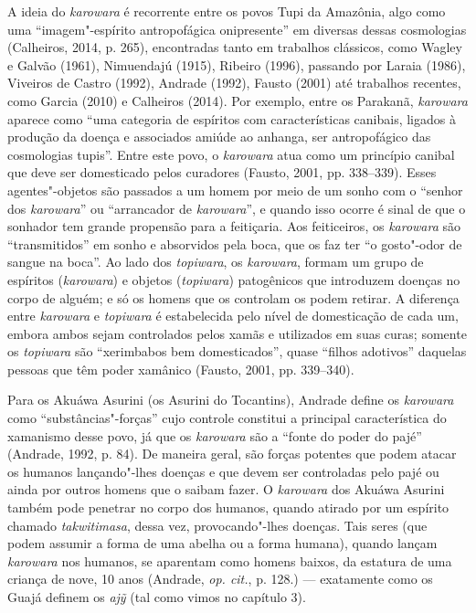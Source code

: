 A ideia do \emph{karowara} é recorrente entre os povos Tupi da Amazônia,
algo como uma ``imagem"-espírito antropofágica onipresente'' em diversas
dessas cosmologias (Calheiros, 2014, p. 265), encontradas tanto em
trabalhos clássicos, como Wagley e Galvão (1961), Nimuendajú (1915),
Ribeiro (1996), passando por Laraia (1986), Viveiros de Castro (1992),
Andrade (1992), Fausto (2001) até trabalhos recentes, como Garcia (2010)
e Calheiros (2014). Por exemplo, entre os Parakanã, \emph{karowara}
aparece como ``uma categoria de espíritos com características canibais,
ligados à produção da doença e associados amiúde ao anhanga, ser
antropofágico das cosmologias tupis''. Entre este povo, o \emph{karowara}
atua como um princípio canibal que deve ser domesticado pelos curadores
(Fausto, 2001, pp. 338--339). Esses agentes"-objetos são passados a um
homem por meio de um sonho com o ``senhor dos \emph{karowara}'' ou
``arrancador de \emph{karowara}'', e quando isso ocorre é sinal de que o
sonhador tem grande propensão para a feitiçaria. Aos feiticeiros, os
\emph{karowara} são ``transmitidos'' em sonho e absorvidos pela boca, que
os faz ter ``o gosto"-odor de sangue na boca''. Ao lado dos
\emph{topiwara}, os \emph{karowara}, formam um grupo de espíritos
(\emph{karowara}) e objetos (\emph{topiwara}) patogênicos que introduzem
doenças no corpo de alguém; e só os homens que os controlam os podem
retirar. A diferença entre \emph{karowara} e \emph{topiwara} é
estabelecida pelo nível de domesticação de cada um, embora ambos sejam
controlados pelos xamãs e utilizados em suas curas; somente os
\emph{topiwara} são ``xerimbabos bem domesticados'', quase ``filhos
adotivos'' daquelas pessoas que têm poder xamânico (Fausto, 2001, pp.
339--340).

Para os Akuáwa Asurini (os Asurini do Tocantins), Andrade define os
\emph{karowara} como ``substâncias"-forças'' cujo controle constitui a
principal característica do xamanismo desse povo, já que os
\emph{karowara} são a ``fonte do poder do pajé'' (Andrade, 1992, p. 84).
De maneira geral, são forças potentes que podem atacar os humanos
lançando"-lhes doenças e que devem ser controladas pelo pajé ou ainda por
outros homens que o saibam fazer. O \emph{karowara} dos Akuáwa Asurini
também pode penetrar no corpo dos humanos, quando atirado por um
espírito chamado \emph{takwitimasa}, dessa vez, provocando"-lhes doenças.
Tais seres (que podem assumir a forma de uma abelha ou a forma humana),
quando lançam \emph{karowara} nos humanos, se aparentam como homens
baixos, da estatura de uma criança de nove, 10 anos (Andrade, \emph{op. cit.},
p. 128.) --- exatamente como os Guajá definem os \emph{ajỹ} (tal como
vimos no capítulo 3).

